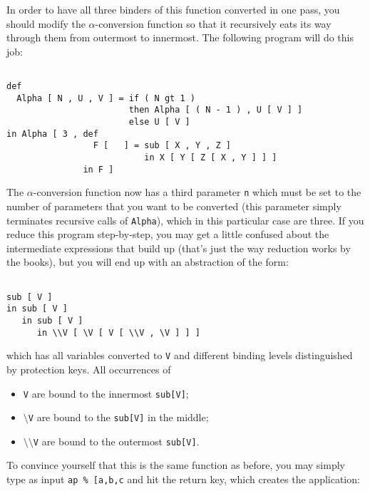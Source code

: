 In order to have all three binders of this function converted in one pass,
you should modify the $\alpha$-conversion function so that it recursively
eats its way through them from outermost to innermost.
 The following program will do this job: 
\begin{verbatim}

def 
  Alpha [ N , U , V ] = if ( N gt 1 )
                        then Alpha [ ( N - 1 ) , U [ V ] ]
                        else U [ V ]
in Alpha [ 3 , def 
                 F [   ] = sub [ X , Y , Z ]
                           in X [ Y [ Z [ X , Y ] ] ]
               in F ]

\end{verbatim}
The $\alpha$-conversion function now has a third parameter {\tt n}
which must be set to the number of  parameters that you want to be converted
 (this parameter simply terminates recursive calls of {\tt Alpha}),
which in this particular case are three. If you reduce this program step-by-step, you may get a little confused about the intermediate expressions that
build up (that's just the way reduction works by the books), but you will end up
with an abstraction of the form:
\begin{verbatim}

sub [ V ]
in sub [ V ]
   in sub [ V ]
      in \\V [ \V [ V [ \\V , \V ] ] ]

\end{verbatim}
which has all variables converted to {\tt V} and different binding levels
distinguished by protection keys. All occurrences of
\begin{itemize}
\item {\tt V} are bound to the innermost {\tt sub[V]};
\item {\tt $\setminus$V} are bound to the {\tt sub[V]} in the middle;
\item {\tt $\setminus\setminus$V} are bound to the outermost {\tt sub[V]}.
\end{itemize}
To convince yourself that this is the same function as before, you may simply
type as input {\tt ap \% [a,b,c} and hit the return key, which creates the 
application:
